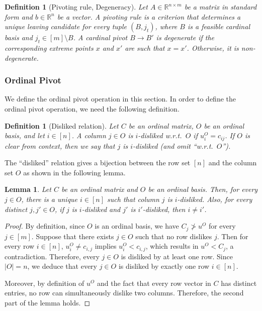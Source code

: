 \documentclass[11pt]{article}
\newcommand{\R}{\mathbb{R}}
\newtheorem{lemma}[theorem]{Lemma}
\newtheorem{definition}[theorem]{Definition}
\begin{document}
\begin{definition}[Pivoting rule, Degeneracy]\label{def:degenerate}
Let $A\in \R^{n\times m}$ be a matrix in standard form and $b\in \R^n$ be a vector. 
A \emph{pivoting rule} is a criterion that determines a unique leaving candidate for every tuple $(B, j_t)$, where $B$ is a feasible cardinal basis and $j_t\in [m]\setminus B$.
A cardinal pivot $B\to B'$ is \emph{degenerate} if the corresponding extreme points $x$ and $x'$ are such that $x=x'$. Otherwise, it is \emph{non-degenerate}.
\end{definition}









\subsubsection{Ordinal Pivot}\label{sec:pre-op}
We define the ordinal pivot operation in this section. In order to define the ordinal pivot operation, we need the following definition. 

\begin{definition}[Disliked relation]
    Let $C$ be an ordinal matrix, $O$ be an ordinal basis, and let $i\in[n]$. A column $j\in O$ is \emph{$i$-disliked} w.r.t.~$O$ if $u_i^O=c_{ij}$. If $O$ is clear from context, then we say that $j$ is $i$-disliked (and omit ``w.r.t.~$O$'').
\end{definition}

The ``disliked'' relation gives a bijection between the row set $[n]$ and the column set $O$ as shown in the following lemma.
\begin{lemma}\label{lem:disliked-oneone}
    Let $C$ be an ordinal matrix and $O$ be an ordinal basis. Then, for every $j\in O$, there is a unique $i\in[n]$ such that column $j$ is $i$-disliked. Also, for every distinct $j,j'\in O$, if $j$ is $i$-disliked and $j'$ is $i'$-disliked, then $i\neq i'$.
\end{lemma}

\begin{proof}
    By definition, since $O$ is an ordinal basis, we have $C_j\ngtr u^O$ for every $j\in[m]$. Suppose that there exists $j\in O$ such that no row dislikes $j$. Then for every row $i\in[n]$, $u^O_i\neq c_{i,j}$ implies $u^O_i<c_{i,j}$, which results in $u^O<C_j$, a contradiction. Therefore, every $j\in O$ is disliked by at least one row. Since $|O|=n$, we deduce that every $j\in O$ is disliked by exactly one row $i\in [n]$. 

    Moreover, by definition of $u^O$ and the fact that every row vector in $C$ has distinct entries, no row can simultaneously dislike two columns. Therefore, the second part of the lemma holds.
\end{proof}
\end{document}
